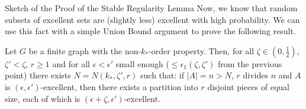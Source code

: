 \documentclass{beamer}
\newcommand{\parround}[1]{( #1 )}
\begin{document}
\begin{frame}{Sketch of the Proof of the Stable Regularity Lemma}
    Now, we know that random subsets of excellent sets are (slightly less) excellent with high probability.
    We can use this fact with a simple Union Bound argument to prove the following result.

    \begin{lemma}
        Let $G$ be a finite graph with the non-$k_{*}$-order property.
        Then, for all $\zeta \in \parround{0, \frac{1}{2}}$, $\zeta' < \zeta$, $r \geq 1$ and for all
        $\epsilon < \epsilon'$ small enough ($\leq \epsilon_1(\zeta, \zeta')$ from the previous point) there exists
        $N = N\parround{k_{*}, \zeta', r}$ such that: if $|A| = n > N$, $r$ divides $n$ and $A$ is
        $\parround{\epsilon, \epsilon'}$-excellent, then there exists a partition into $r$ disjoint pieces of equal
        size, each of which is $\parround{\epsilon + \zeta, \epsilon'}$-excellent.
    \end{lemma}
\end{frame}
\end{document}
